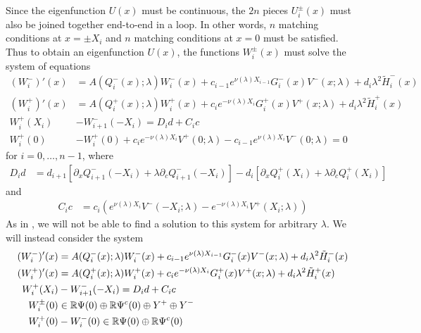 \documentclass[thesis.tex]{subfiles}
\begin{document}
Since the eigenfunction $U(x)$ must be continuous, the $2n$ pieces $U_i^\pm(x)$ must also be joined together end-to-end in a loop. In other words, $n$ matching conditions at $x = \pm X_i$ and $n$ matching conditions at $x = 0$ must be satisfied. Thus to obtain an eigenfunction $U(x)$, the functions $W_i^\pm(x)$ must solve the system of equations
\begin{equation}\label{eigsystem0}
\begin{aligned}
(W_i^-)'(x) &= A(Q_i^-(x); \lambda) W_i^-(x) + c_{i-1} e^{\nu(\lambda)X_{i-1}} G_i^-(x)V^-(x; \lambda) + d_i \lambda^2 \tilde{H}_i^-(x) \\
(W_i^+)'(x) &= A(Q_i^+(x); \lambda) W_i^+(x) + c_i e^{-\nu(\lambda)X_i } G_i^+(x)V^+(x; \lambda) + d_i \lambda^2 \tilde{H}_i^+(x) \\
W_i^+(X_i) &- W_{i+1}^-(-X_i) = D_i d + C_i c \\
W_i^+(0) &- W_i^+(0) + c_i e^{-\nu(\lambda)X_i}V^+(0; \lambda) - c_{i-1} e^{\nu(\lambda)X_i} V^-(0; \lambda) = 0
\end{aligned}
\end{equation}
for $i = 0, \dots, n-1$, where
\begin{align}\label{defDid}
D_i d &= d_{i+1}[\partial_x Q_{i+1}^-(-X_i) + \lambda \partial_c Q_{i+1}^-(-X_i)]
- d_i [ \partial_x Q_i^+(X_i) + \lambda \partial_c Q_i^+(X_i) ]
\end{align}
and
\begin{align}\label{defCic}
C_i c &= c_i \left( e^{\nu(\lambda) X_i} V^-(-X_i; \lambda) - e^{-\nu(\lambda) X_i} V^+(X_i; \lambda) \right)
\end{align}
As in \cite{Sandstede1998}, we will not be able to find a solution to this system for arbitrary $\lambda$. We will instead consider the system
\begin{equation}\label{eigsystem}
\begin{aligned}
(W_i^-)'(x) &= A(Q_i^-(x); \lambda) W_i^-(x) + c_{i-1} e^{\nu(\lambda)X_{i-1}} G_i^-(x)V^-(x; \lambda) + d_i \lambda^2 \tilde{H}_i^-(x) \\
(W_i^+)'(x) &= A(Q_i^+(x); \lambda) W_i^+(x) + c_i e^{-\nu(\lambda)X_i } G_i^+(x)V^+(x; \lambda) + d_i \lambda^2 \tilde{H}_i^+(x) \\
W_i^+(X_i) &- W_{i+1}^-(-X_i) = D_i d + C_i c \\
W_i^\pm(0) &\in \mathbb{R} \Psi(0) \oplus \mathbb{R} \Psi^c(0) \oplus Y^+ \oplus Y^- \\
W_i^+(0) &- W_i^-(0) \in \mathbb{R} \Psi(0) \oplus \mathbb{R} \Psi^c(0) 
\end{aligned}
\end{equation}
\end{document}
